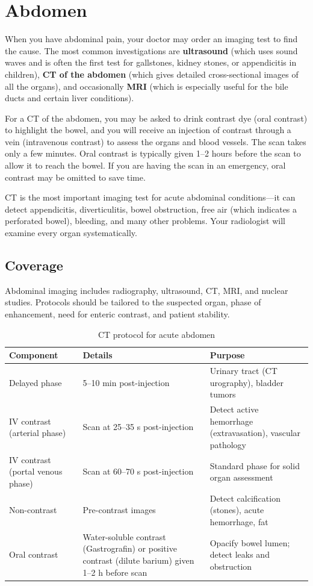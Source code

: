 \chapter{Abdomen}

\label{ch:ch44_abdomen}

When you have abdominal pain, your doctor may order an imaging test to find the cause. The most common investigations are \textbf{ultrasound} (which uses sound waves and is often the first test for gallstones, kidney stones, or appendicitis in children), \textbf{CT of the abdomen} (which gives detailed cross-sectional images of all the organs), and occasionally \textbf{MRI} (which is especially useful for the bile ducts and certain liver conditions).

For a CT of the abdomen, you may be asked to drink contrast dye (oral contrast) to highlight the bowel, and you will receive an injection of contrast through a vein (intravenous contrast) to assess the organs and blood vessels. The scan takes only a few minutes. Oral contrast is typically given 1--2 hours before the scan to allow it to reach the bowel. If you are having the scan in an emergency, oral contrast may be omitted to save time.

CT is the most important imaging test for acute abdominal conditions---it can detect appendicitis, diverticulitis, bowel obstruction, free air (which indicates a perforated bowel), bleeding, and many other problems. Your radiologist will examine every organ systematically.


\section{Coverage}
Abdominal imaging includes radiography, ultrasound, CT, MRI, and nuclear studies. Protocols should be tailored to the suspected organ, phase of enhancement, need for enteric contrast, and patient stability.

\begin{table}[h]
\centering
\caption{CT protocol for acute abdomen}
\begin{tabular}{p{3cm} p{4.5cm} p{4.5cm}}
\hline
\textbf{Component} & \textbf{Details} & \textbf{Purpose} \\
\hline
Delayed phase & 5--10 min post-injection & Urinary tract (CT urography), bladder tumors \\
IV contrast (arterial phase) & Scan at 25--35 s post-injection & Detect active hemorrhage (extravasation), vascular pathology \\
IV contrast (portal venous phase) & Scan at 60--70 s post-injection & Standard phase for solid organ assessment \\
Non-contrast & Pre-contrast images & Detect calcification (stones), acute hemorrhage, fat \\
Oral contrast & Water-soluble contrast (Gastrografin) or positive contrast (dilute barium) given 1--2 h before scan & Opacify bowel lumen; detect leaks and obstruction \\
\hline
\end{tabular}
\end{table}

